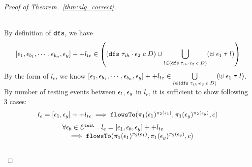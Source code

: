 \begin{proof}[Proof of Theorem.~\ref{thm:alg_correct}]
\begin{case}
\begin{subcase}
\\
By definition of $\mathtt{dfs}$, we have
%
\[
  [\event_1, \event_{b_1}, \cdots, \event_{b_n}, \event_y] ++ l_{te}  \in 
  \left(  (\kw{dfs} \eapp {\trace_{ih} \cdot \event_2} \eapp c \eapp D ) \cup
  \bigcup\limits_{l \in (\kw{dfs} \eapp {\trace_{ih} \cdot \event_2} \eapp c \eapp D) }(\uplus \eapp \event_1 \eapp \trace \eapp l)
  \right)
\]
%
By the form of $l_e$, we know
$[\mathtt{\epsilon}_1, \mathtt{\epsilon}_{b_1}, \cdots, \mathtt{\epsilon}_{b_n}, \mathtt{\epsilon}_y] ++ l_{te}  \in  
\bigcup\limits_{l \in (\mathtt{dfs} \; {\mathtt{\tau}_{ih} \cdot \mathtt{\epsilon}_2} \; c \; D) } (\uplus \; \mathtt{\epsilon}_1 \; \mathtt{\tau} \; l)$.
\\
By number of testing events between $\mathtt{\epsilon}_1, \mathtt{\epsilon}_y$ in $l_e$, it is sufficient to show following 3 cases:
\begin{equation}
\begin{array}{l}
  l_e = [\mathtt{\epsilon}_1, \mathtt{\epsilon}_y] ++ l_{te}
   \implies \mathtt{flowsTo}(\pi_1(\mathtt{\epsilon}_1)^{\pi_2(\mathtt{\epsilon}_1)}, \pi_1(\mathtt{\epsilon}_y)^{\pi_2(\mathtt{\epsilon}_y)}, c)
\end{array}
\end{equation}
%
\begin{equation}
  \begin{array}{l}
    \forall \mathtt{\epsilon}_b \in \mathcal{E}^{\mathtt{{test}}} ~.~ 
    l_e = [\mathtt{\epsilon}_1, \mathtt{\epsilon}_b, \mathtt{\epsilon}_y] ++ l_{te}
    \\ \quad
    \implies \mathtt{flowsTo}(\pi_1(\mathtt{\epsilon}_1)^{\pi_2(\mathtt{\epsilon}_1)}, \pi_1(\mathtt{\epsilon}_y)^{\pi_2(\mathtt{\epsilon}_y)}, c)
\end{array}
  \end{equation}
%
%
\begin{equation}
\begin{array}{l}

\end{array}
\end{equation}
\end{subcase}
\end{case}
\end{proof}
